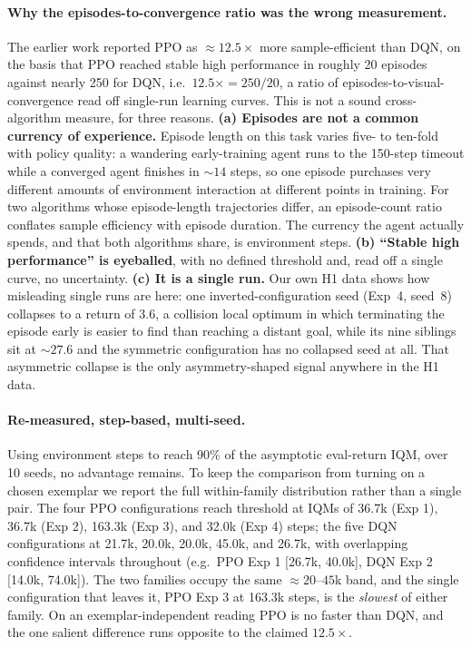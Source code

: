 \paragraph{Why the episodes-to-convergence ratio was the wrong measurement.} The earlier work
reported PPO as ${\approx}12.5\times$ more sample-efficient than DQN, on the basis that PPO
reached stable high performance in roughly 20 episodes against nearly 250 for DQN, i.e.\
$12.5\times = 250/20$, a ratio of episodes-to-visual-convergence read off single-run learning
curves. This is not a sound cross-algorithm measure, for three reasons. \textbf{(a) Episodes
are not a common currency of experience.} Episode length on this task varies five- to
ten-fold with policy quality: a wandering early-training agent runs to the 150-step timeout
while a converged agent finishes in ${\sim}14$ steps, so one episode purchases very different
amounts of environment interaction at different points in training. For two algorithms whose
episode-length trajectories differ, an episode-count ratio conflates sample efficiency with
episode duration. The currency the agent actually spends, and that both algorithms share, is
environment steps. \textbf{(b) ``Stable high performance'' is eyeballed}, with no defined
threshold and, read off a single curve, no uncertainty. \textbf{(c) It is a single run.} Our
own H1 data shows how misleading single runs are here: one inverted-configuration seed
(Exp~4, seed~8) collapses to a return of 3.6, a collision local optimum in which terminating
the episode early is easier to find than reaching a distant goal, while its nine siblings sit
at ${\sim}27.6$ and the symmetric configuration has no collapsed seed at all. That asymmetric
collapse is the only asymmetry-shaped signal anywhere in the H1 data.

\paragraph{Re-measured, step-based, multi-seed.} Using environment steps to reach 90\% of the
asymptotic eval-return IQM, over 10 seeds, no advantage remains. To keep the comparison from
turning on a chosen exemplar we report the full within-family distribution rather than a
single pair. The four PPO configurations reach threshold at IQMs of 36.7k (Exp 1), 36.7k
(Exp 2), 163.3k (Exp 3), and 32.0k (Exp 4) steps; the five DQN configurations at 21.7k, 20.0k,
20.0k, 45.0k, and 26.7k, with overlapping confidence intervals throughout (e.g.\ PPO Exp 1
[26.7k, 40.0k], DQN Exp 2 [14.0k, 74.0k]). The two families occupy the same
${\approx}20$--$45$k band, and the single configuration that leaves it, PPO Exp 3 at 163.3k
steps, is the \emph{slowest} of either family. On an exemplar-independent reading PPO is no
faster than DQN, and the one salient difference runs opposite to the claimed $12.5\times$.

